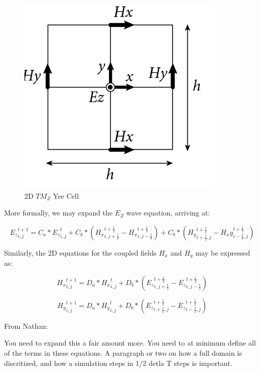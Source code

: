 \begin{figure}[H]
	\centering
	\includegraphics{yee-cell-ez.png}
	\caption{2D $TM_Z$ Yee Cell}
	\label{fig:yeecell}
\end{figure}

More formally, we may expand the $E_Z$ wave equation, arriving at:

\begin{equation} \label{eq:ezupdate}
{E_z}_{i,j}^{t+1} = C_a * {E_z}_{i,j}^{t} 
+ C_b * ({H_x}_{i,j+\frac{1}{2}}^{t+\frac{1}{2}} - {H_x}_{i,j-\frac{1}{2}}^{t+\frac{1}{2}})
+ C_b * ({H_y}_{i+\frac{1}{2},j}^{t+\frac{1}{2}} - {H_xy}_{i-\frac{1}{2},j}^{t+\frac{1}{2}})
\end{equation}

Similarly, the 2D equations for the coupled fields $H_x$ and $H_y$ may be expressed as:

\begin{equation} \label{eq:hxupdate}
{H_x}_{i,j}^{t+1} = D_a * {H_x}_{i,j}^{t} + D_b * (
{E_z}_{i,j+\frac{1}{2}}^{t+\frac{1}{2}} 
-
{E_z}_{i,j-\frac{1}{2}}^{t+\frac{1}{2}}
)  
\end{equation}

\begin{equation} \label{eq:hyupdate}
{H_y}_{i,j}^{t+1} = D_a * {H_y}_{i,j}^{t} + D_b * (
{E_z}_{i+\frac{1}{2},j}^{t+\frac{1}{2}} 
-
{E_z}_{i-\frac{1}{2},j}^{t+\frac{1}{2}}
)  
\end{equation}

\iffalse
From Nathan:

You need to expand this a fair amount more.  You need to at minimum define all of the terms in these equations.  A paragraph or two on how a full domain is discritized, and how a simulation steps in 1/2 detla T steps is important.  

